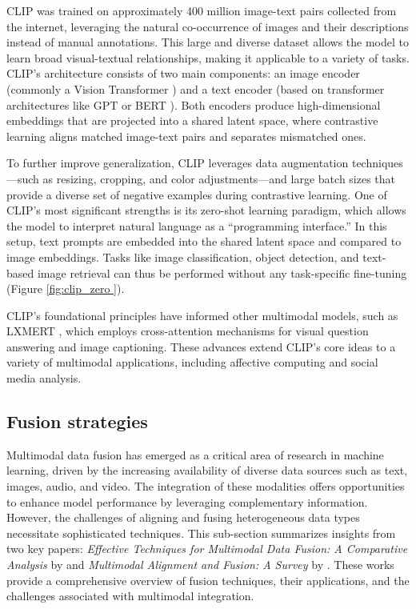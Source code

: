 CLIP was trained on approximately 400 million image-text pairs collected from the internet, leveraging the natural co-occurrence of images and their descriptions instead of manual annotations. This large and diverse dataset allows the model to learn broad visual-textual relationships, making it applicable to a variety of tasks. CLIP’s architecture consists of two main components: an image encoder (commonly a Vision Transformer \cite{dosovitskiy2021imageworth16x16words}) and a text encoder (based on transformer architectures like GPT or BERT \cite{Radford2018ImprovingLU, DBLP:journals/corr/abs-1810-04805}). Both encoders produce high-dimensional embeddings that are projected into a shared latent space, where contrastive learning aligns matched image-text pairs and separates mismatched ones.
\newline

To further improve generalization, CLIP leverages data augmentation techniques—such as resizing, cropping, and color adjustments—and large batch sizes that provide a diverse set of negative examples during contrastive learning. One of CLIP’s most significant strengths is its zero-shot learning paradigm, which allows the model to interpret natural language as a “programming interface.” In this setup, text prompts are embedded into the shared latent space and compared to image embeddings. Tasks like image classification, object detection, and text-based image retrieval can thus be performed without any task-specific fine-tuning (Figure \ref{fig:clip_zero }).
\newline

CLIP’s foundational principles have informed other multimodal models, such as LXMERT \cite{tan2019lxmertlearningcrossmodalityencoder}, which employs cross-attention mechanisms for visual question answering and image captioning. These advances extend CLIP’s core ideas to a variety of multimodal applications, including affective computing and social media analysis.



\subsection{Fusion strategies}

Multimodal data fusion has emerged as a critical area of research in machine learning, driven by the increasing availability of diverse data sources such as text, images, audio, and video. The integration of these modalities offers opportunities to enhance model performance by leveraging complementary information. However, the challenges of aligning and fusing heterogeneous data types necessitate sophisticated techniques. This sub-section summarizes insights from two key papers: \emph{Effective Techniques for Multimodal Data Fusion: A Comparative Analysis} by \cite{pawlowski_effective_2023} and \emph{Multimodal Alignment and Fusion: A Survey} by \cite{li_multimodal_2024}. These works provide a comprehensive overview of fusion techniques, their applications, and the challenges associated with multimodal integration.

